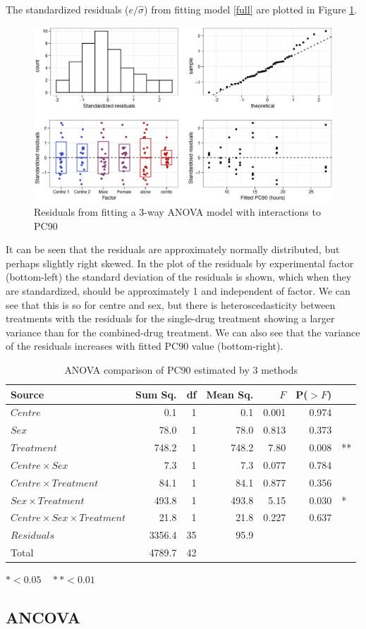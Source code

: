 The standardized residuals ($e/\hat{\sigma}$) from fitting model \ref{full} are plotted in Figure \ref{aovloglinres}.
\begin{figure}[h]
\includegraphics[width=6.5in]{aovloglinres.eps} 
\caption{Residuals from fitting a 3-way ANOVA model with interactions to PC90}
\label{aovloglinres}
\end{figure}
It can be seen that the residuals are approximately normally distributed, but perhaps slightly right skewed. In the plot of the residuals by experimental factor (bottom-left) the standard deviation of the residuals is shown, which when they are standardized, should be approximately 1 and independent of factor. We can see that this is so for centre and sex, but there is heteroscedasticity between treatments with the residuals for the single-drug treatment showing a larger variance than for the combined-drug treatment. We can also see that the variance of the residuals increases with fitted PC90 value (bottom-right).
\begin{table}[h]
\centering
\caption{ANOVA comparison of PC90 estimated by 3 methods}\label{pc90aov}
\begin{tabular}{l|rrrrrl}
Source&Sum Sq.&df&Mean Sq.&$F$&P($>F$)\\
\hline
$Centre$     &               0.1  &1&   0.1 & 0.001 &0.974&\\
$Sex$        &              78.0 &1&   78.0 & 0.813 &0.373&\\
$Treatment$  &            748.2 &1&  748.2 & 7.80 &0.008& **\\
$Centre\times Sex$ &              7.3  &1&   7.3 & 0.077& 0.784&\\
$Centre\times Treatment$ &        84.1 &1&   84.1 & 0.877& 0.356&\\
$Sex\times Treatment$     &     493.8 &1&  493.8 & 5.15 &0.030& *\\
$Centre\times Sex\times Treatment$ &    21.8 &1&   21.8&  0.227& 0.637&\\
$Residuals$      &    3356.4  & 35 & 95.9&&&\\
\hline
Total&4789.7&42&&&
\end{tabular}
$*<0.05\quad**<0.01$
\end{table}

\subsection{ANCOVA}